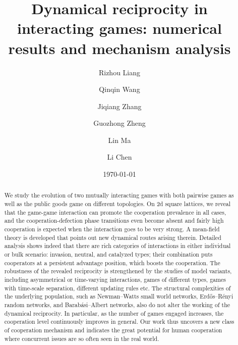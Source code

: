 \documentclass[showpacs,superscriptaddress,reprint,nofootinbib,amsmath,amssymb,aps,pre]{revtex4-1}
\begin{document}
\title{Dynamical reciprocity in interacting games: numerical results and mechanism analysis}

\author{Rizhou Liang}
\author{Qinqin Wang}
\author{Jiqiang Zhang}
\author{Guozhong Zheng}
\author{Lin Ma}
\author{Li Chen}

\date{\today }

\begin{abstract}
We study the evolution of two mutually interacting games with both pairwise games as well as the public goods game on different topologies. On 2d square lattices, we reveal that the game-game interaction can promote the cooperation prevalence in all cases, and the cooperation-defection phase transitions even become absent and fairly high cooperation is expected when the interaction goes to be very strong. 
A mean-field theory is developed that points out new dynamical routes arising therein. Detailed analysis shows indeed that there are rich categories of interactions in either individual or bulk scenario: invasion, neutral, and catalyzed types; their combination puts cooperators at a persistent advantage position, which boosts the cooperation. The robustness of the revealed reciprocity is strengthened by the studies of model variants, including asymmetrical or time-varying interactions, games of different types, games with time-scale separation, different updating rules etc. The structural complexities of the underlying population, such as Newman--Watts small world networks, Erd\H{o}s--R\'enyi random networks, and Barab\'asi--Albert networks, also do not alter the working of the dynamical reciprocity. In particular, as the number of games engaged increases, the cooperation level continuously improves in general. Our work thus uncovers a new class of cooperation mechanism and indicates the great potential for human cooperation where concurrent issues are so often seen in the real world. 
\end{abstract}
\maketitle
\end{document}

